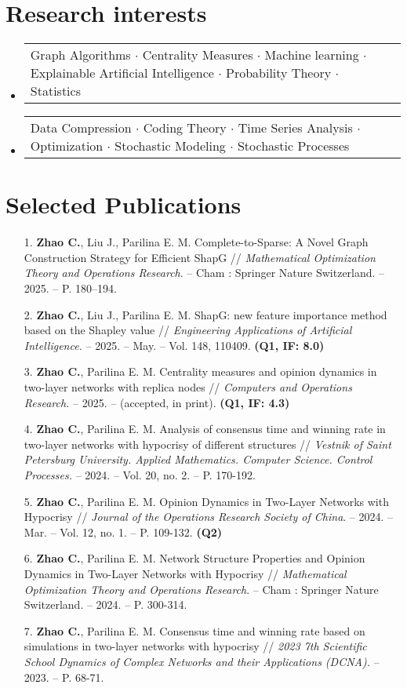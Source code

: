 \documentclass[letterpaper,10pt]{article}
\makeatletter
\newcommand{\resumeProjectHeading}[2]{
  \item
  \begin{tabular*}{0.97\textwidth}{l@{\extracolsep{\fill}}r}
    \small#1 & #2 \\
  \end{tabular*}\vspace{-7pt}
}
\newenvironment{resumeSubHeadingList}{\begin{itemize}[leftmargin=0.15in, label={}]}{\end{itemize}}
\makeatother
\begin{document}
\section{Research interests}
\begin{resumeSubHeadingList}
  \resumeProjectHeading{
    Graph Algorithms $\cdot$ Centrality Measures $\cdot$ Machine learning
    $\cdot$ Explainable Artificial Intelligence $\cdot$ Probability Theory
    $\cdot$ Statistics}{}
  \resumeProjectHeading{
    Data Compression $\cdot$ Coding Theory $\cdot$ Time Series Analysis $\cdot$
    Optimization $\cdot$ Stochastic Modeling $\cdot$ Stochastic Processes}{}
\end{resumeSubHeadingList}

\section{Selected Publications}
\begin{enumerate}
  \fontsize{10}{10.5}\selectfont
  \item [1.] \textbf{Zhao C.}, Liu J., Parilina E. M. Complete-to-Sparse: A Novel Graph Construction Strategy for Efficient ShapG // {\it Mathematical Optimization Theory and Operations Research}. -- Cham : Springer Nature Switzerland. -- 2025. -- P. 180–194.
  \item [2.] \textbf{Zhao C.}, Liu J., Parilina E. M. ShapG: new feature importance method based on the Shapley value // {\it Engineering Applications of Artificial Intelligence.} -- 2025. -- May. -- Vol. 148, 110409. {\bf (Q1, IF: 8.0)}
  \item [3.] \textbf{Zhao C.}, Parilina E. M. Centrality measures and opinion dynamics in two-layer networks with replica nodes // {\it Computers and Operations Research.} -- 2025. -- (accepted, in print). {\bf (Q1, IF: 4.3)}
  \item [4.] \textbf{Zhao C.}, Parilina E. M. Analysis of consensus time and winning rate in two-layer networks with hypocrisy of different structures // {\it Vestnik of Saint Petersburg University. Applied Mathematics. Computer Science. Control Processes.} -- 2024. -- Vol. 20, no. 2. -- P. 170-192.
  \item [5.] \textbf{Zhao C.}, Parilina E. M. Opinion Dynamics in Two-Layer Networks with Hypocrisy // {\it Journal of the Operations Research Society of China}. -- 2024. -- Mar. -- Vol. 12, no. 1. -- P. 109-132. {\bf (Q2)}
  \item [6.] \textbf{Zhao C.}, Parilina E. M. Network Structure Properties and Opinion Dynamics in Two-Layer Networks with Hypocrisy // {\it Mathematical Optimization Theory and Operations Research}. -- Cham : Springer Nature Switzerland. -- 2024. -- P. 300-314.
  \item [7.] \textbf{Zhao C.}, Parilina E. M. Consensus time and winning rate based on simulations in two-layer networks with hypocrisy // {\it 2023 7th Scientific School Dynamics of Complex Networks and their Applications (DCNA).} -- 2023. -- P. 68-71.
\end{enumerate}
\end{document}
